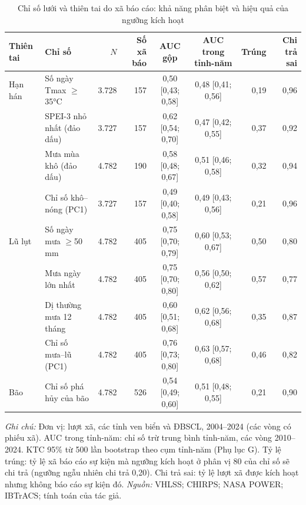 \documentclass[12pt,a4paper]{article}
\begin{document}
\begin{table}[!tbp]
\centering\scriptsize
\setlength{\tabcolsep}{2.6pt}
\caption{Chỉ số lưới và thiên tai do xã báo cáo: khả năng phân biệt và hiệu quả của ngưỡng kích hoạt}
\label{tab:auc}
\begin{tabular}{@{}llrrccrr@{}}
\toprule
Thiên tai & Chỉ số & $N$ & Số xã báo & AUC gộp & AUC trong tỉnh-năm & Trúng & Chi trả sai \\
\midrule
Hạn hán & Số ngày Tmax $\geq$35°C & 3.728 & 157 & 0,50 [0,43; 0,58] & 0,48 [0,41; 0,56] & 0,19 & 0,96 \\
 & SPEI-3 nhỏ nhất (đảo dấu) & 3.727 & 157 & 0,62 [0,54; 0,70] & 0,47 [0,42; 0,55] & 0,37 & 0,92 \\
 & Mưa mùa khô (đảo dấu) & 4.782 & 190 & 0,58 [0,48; 0,67] & 0,51 [0,46; 0,58] & 0,32 & 0,94 \\
 & Chỉ số khô--nóng (PC1) & 3.727 & 157 & 0,49 [0,40; 0,58] & 0,49 [0,43; 0,56] & 0,21 & 0,96 \\
\midrule
Lũ lụt & Số ngày mưa $\geq$50 mm & 4.782 & 405 & 0,75 [0,70; 0,79] & 0,60 [0,53; 0,67] & 0,50 & 0,80 \\
 & Mưa ngày lớn nhất & 4.782 & 405 & 0,75 [0,70; 0,80] & 0,56 [0,50; 0,62] & 0,57 & 0,77 \\
 & Dị thường mưa 12 tháng & 4.782 & 405 & 0,60 [0,51; 0,68] & 0,62 [0,56; 0,68] & 0,35 & 0,87 \\
 & Chỉ số mưa--lũ (PC1) & 4.782 & 405 & 0,76 [0,73; 0,80] & 0,63 [0,57; 0,68] & 0,46 & 0,82 \\
\midrule
Bão & Chỉ số phá hủy của bão & 4.782 & 526 & 0,54 [0,49; 0,60] & 0,51 [0,48; 0,55] & 0,21 & 0,90 \\
\bottomrule
\end{tabular}
\begin{minipage}{\textwidth}\footnotesize
\textit{Ghi chú:} Đơn vị: lượt xã, các tỉnh ven biển và ĐBSCL, 2004--2024 (các vòng có phiếu xã). AUC trong tỉnh-năm: chỉ số trừ trung bình tỉnh-năm, các vòng 2010--2024. KTC 95\% từ 500 lần bootstrap theo cụm tỉnh-năm (Phụ lục G). Tỷ lệ trúng: tỷ lệ xã báo cáo sự kiện mà ngưỡng kích hoạt ở phân vị 80 của chỉ số sẽ chi trả (ngưỡng ngẫu nhiên chi trả 0,20). Chi trả sai: tỷ lệ lượt xã được kích hoạt nhưng không báo cáo sự kiện đó. \textit{Nguồn:} VHLSS; CHIRPS; NASA POWER; IBTrACS; tính toán của tác giả.
\end{minipage}
\end{table}
\end{document}
